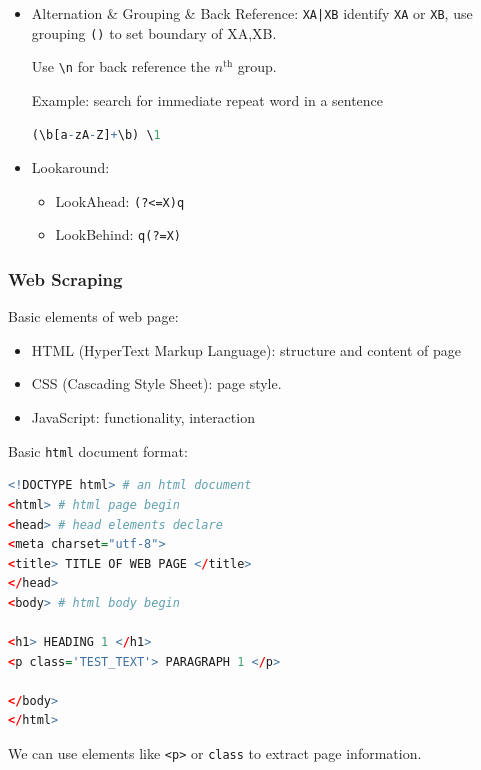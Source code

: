 \begin{itemize}[topsep=2pt,itemsep=0pt]
        
    \item Alternation \& Grouping \& Back Reference: \lstinline!XA|XB! identify \lstinline|XA| or \lstinline|XB|, use grouping \lstinline|()| to set boundary of XA,XB.
    
    Use \lstinline|\n| for back reference the $ n^\mathrm{th}  $ group. 
\begin{rcode}
    Example: search for immediate repeat word in a sentence
\begin{lstlisting}[language=R]
(\b[a-zA-Z]+\b) \1
\end{lstlisting}
\end{rcode}
    \item Lookaround: 
    \begin{itemize}[topsep=2pt,itemsep=0pt]
        \item LookAhead: \lstinline|(?<=X)q|
        \item LookBehind: \lstinline|q(?=X)|
    \end{itemize}
    
        
\end{itemize}

    
\subsubsection{Web Scraping}
    Basic elements of web page:
\begin{itemize}[topsep=2pt,itemsep=0pt]
    \item HTML (HyperText Markup Language): structure and content of page
    \item CSS (Cascading Style Sheet): page style.
    \item JavaScript: functionality, interaction
\end{itemize}

        
Basic \lstinline|html| document format:
\begin{rcode}
\begin{lstlisting}[language=R]
<!DOCTYPE html> # an html document
<html> # html page begin
<head> # head elements declare
<meta charset="utf-8">
<title> TITLE OF WEB PAGE </title>
</head>
<body> # html body begin
 
<h1> HEADING 1 </h1>
<p class='TEST_TEXT'> PARAGRAPH 1 </p>
 
</body>
</html>
\end{lstlisting}
\end{rcode}

    We can use elements like \lstinline|<p>| or \lstinline|class| to extract page information.

